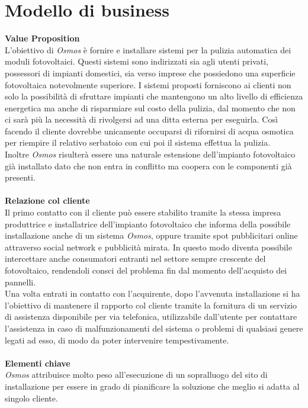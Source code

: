\documentclass[a4paper, 12pt]{article}
\begin{document}
	\section{Modello di business}
	\textbf{Value Proposition}\\
	L'obiettivo di \emph{Osmos} è fornire e installare sistemi per la pulizia automatica dei moduli fotovoltaici. Questi sistemi sono indirizzati sia agli utenti privati, possessori di impianti domestici, sia verso imprese che possiedono una superficie fotovoltaica notevolmente superiore. I sistemi proposti forniscono ai clienti non solo la possibilità di sfruttare impianti che mantengono un alto livello di efficienza energetica ma anche di risparmiare sul costo della pulizia, dal momento che non ci sarà più la necessità di rivolgersi ad una ditta esterna per eseguirla. Così facendo il cliente dovrebbe unicamente occuparsi di rifornirsi di acqua osmotica per riempire il relativo serbatoio con cui poi il sistema effettua la pulizia.\\
	Inoltre \emph{Osmos} risulterà essere una naturale estensione dell'impianto fotovoltaico già installato dato che non entra in conflitto ma coopera con le componenti già presenti.\\\\
	\textbf{Relazione col cliente}\\
	Il primo contatto con il cliente può essere stabilito tramite la stessa impresa produttrice e installatrice dell'impianto fotovoltaico che informa della possibile installazione anche di un sistema \emph{Osmos}, oppure tramite spot pubblicitari online attraverso social network e pubblicità mirata. In questo modo diventa possibile intercettare anche consumatori entranti nel settore sempre crescente del fotovoltaico, rendendoli consci del problema fin dal momento dell'acquisto dei pannelli.\\
	Una volta entrati in contatto con l'acquirente, dopo l'avvenuta installazione si ha l'obiettivo di mantenere il rapporto col cliente tramite la fornitura di un servizio di assistenza disponibile per via telefonica, utilizzabile dall'utente per contattare l'assistenza in caso di malfunzionamenti del sistema o problemi di qualsiasi genere legati ad esso, di modo da poter intervenire tempestivamente.\\\\
	\textbf{Elementi chiave}\\
	\emph{Osmos} attribuisce molto peso all'esecuzione di un sopralluogo del sito di installazione per essere in grado di pianificare la soluzione che meglio si adatta al singolo cliente.\\
\end{document}
